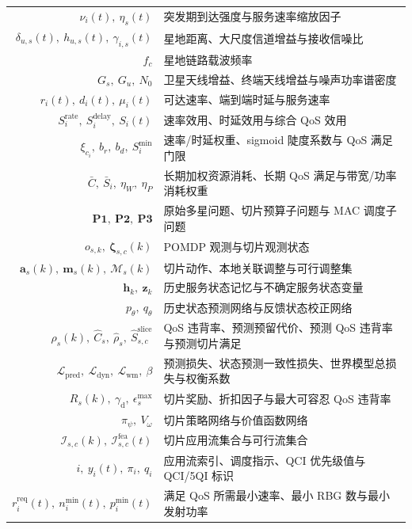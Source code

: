 \begin{nomenclature}
\begin{longtable}{rl}
  $\nu_i(t),\ \eta_s(t)$               & 突发期到达强度与服务速率缩放因子 \\
  $\delta_{u,s}(t),\ h_{u,s}(t),\ \gamma_{i,s}(t)$ & 星地距离、大尺度信道增益与接收信噪比 \\
  $f_c$                                & 星地链路载波频率 \\
  $G_s,\ G_u,\ N_0$                    & 卫星天线增益、终端天线增益与噪声功率谱密度 \\
  $r_i(t),\ d_i(t),\ \mu_i(t)$         & 可达速率、端到端时延与服务速率 \\
  $S_i^{\mathrm{rate}},\ S_i^{\mathrm{delay}},\ S_i(t)$ & 速率效用、时延效用与综合 QoS 效用 \\
  $\xi_{c_i},\ b_r,\ b_d,\ S_i^{\min}$ & 速率/时延权重、sigmoid 陡度系数与 QoS 满足门限 \\
  $\bar C,\ \bar S_i,\ \eta_W,\ \eta_P$ & 长期加权资源消耗、长期 QoS 满足与带宽/功率消耗权重 \\
  $\mathbf{P1},\ \mathbf{P2},\ \mathbf{P3}$ & 原始多星问题、切片预算子问题与 MAC 调度子问题 \\
  $o_{s,k},\ \boldsymbol\zeta_{s,c}(k)$ & POMDP 观测与切片观测状态 \\
  $\mathbf a_s(k),\ \mathbf m_s(k),\ \mathcal M_s(k)$ & 切片动作、本地关联调整与可行调整集 \\
  $\boldsymbol h_k,\ \boldsymbol z_k$  & 历史服务状态记忆与不确定服务状态变量 \\
  $p_\theta,\ q_\theta$                & 历史状态预测网络与反馈状态校正网络 \\
  $\rho_s(k),\ \hat C_s,\ \hat\rho_s,\ \hat S_{s,c}^{\mathrm{slice}}$ & QoS 违背率、预测预留代价、预测 QoS 违背率与预测切片满足 \\
  $\mathcal L_{\mathrm{pred}},\ \mathcal L_{\mathrm{dyn}},\ \mathcal L_{\mathrm{wm}},\ \beta$ & 预测损失、状态预测一致性损失、世界模型总损失与权衡系数 \\
  $R_s(k),\ \gamma_{\mathrm d},\ \epsilon_s^{\max}$ & 切片奖励、折扣因子与最大可容忍 QoS 违背率 \\
  $\pi_\psi,\ V_\omega$                & 切片策略网络与价值函数网络 \\
  $\mathcal I_{s,c}(k),\ \mathcal I_{s,c}^{\mathrm{fea}}(t)$ & 切片应用流集合与可行流集合 \\
  $i,\ y_i(t),\ \pi_i,\ q_i$           & 应用流索引、调度指示、QCI 优先级值与 QCI/5QI 标识 \\
  $r_i^{\mathrm{req}}(t),\ n_i^{\min}(t),\ p_i^{\min}(t)$ & 满足 QoS 所需最小速率、最小 RBG 数与最小发射功率 \\

\end{longtable}
\end{nomenclature}
